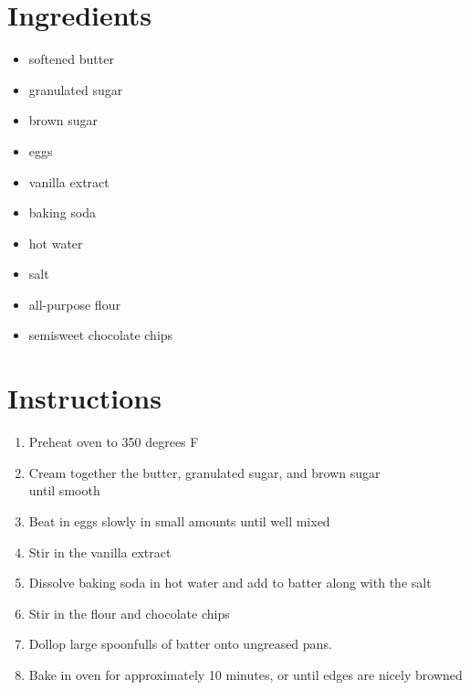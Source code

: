 \documentclass[]{article}
\begin{document}
\section*{Ingredients}
\begin{itemize}
\item softened butter
\item granulated sugar
\item brown sugar
\item eggs
\item vanilla extract
\item baking soda
\item hot water
\item salt
\item all-purpose flour
\item semisweet chocolate chips
\end{itemize}
\vspace{\baselineskip}
\section*{Instructions}
\begin{enumerate}
\item Preheat oven to 350 degrees F
\item Cream together the butter, granulated sugar, and brown sugar\\
until smooth
\item Beat in eggs slowly in small amounts until well mixed
\item Stir in the vanilla extract
\item Dissolve baking soda in hot water and add to batter along with the salt
\item Stir in the flour and chocolate chips
\item Dollop large spoonfulls of batter onto ungreased pans.
\item Bake in oven for approximately 10 minutes, or until edges are nicely browned
\end{enumerate}
\end{document}

